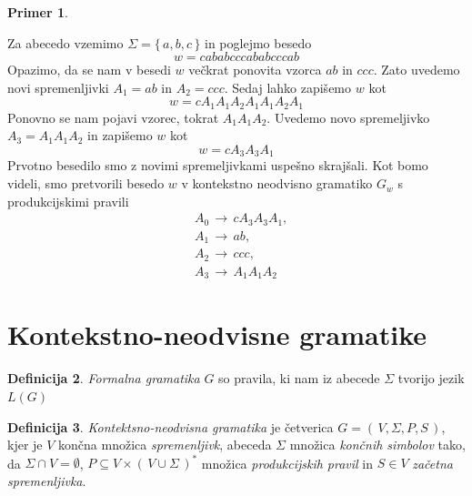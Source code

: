\documentclass{amsart}
\theoremstyle{definition} %
\newtheorem{definicija}{Definicija}[section]
\newtheorem{primer}[definicija]{Primer}
\theoremstyle{plain} %
\begin{document}
\begin{primer}\label{Kompresija}
    
    Za abecedo vzemimo $ \Sigma = \{\, a,b,c \,\} $ in poglejmo besedo
    \[
        w = cababcccababcccab
    \]
    Opazimo, da se nam v besedi $ w $ večkrat ponovita vzorca $ ab $ in $ ccc $. Zato
    uvedemo novi spremenljivki $ A_1 = ab $ in $ A_2 = ccc $. Sedaj lahko zapišemo $ w $ kot
    \[
        w = cA_1A_1A_2A_1A_1A_2A_1
    \]
    Ponovno se nam pojavi vzorec, tokrat $ A_1A_1A_2 $. Uvedemo novo spremeljivko $ A_3 = A_1A_1A_2 $
    in zapišemo $ w $ kot
    \[
        w = cA_3A_3A_1
    \]
    Prvotno besedilo smo z novimi spremeljivkami uspešno skrajšali. Kot bomo videli, smo
    pretvorili besedo $ w $ v kontekstno neodvisno gramatiko $ G_w $ s
    produkcijskimi pravili
    \begin{align*}
        & A_0 \, \rightarrow \, cA_3A_3A_1, \\
        & A_1 \, \rightarrow \, ab, \\
        & A_2 \, \rightarrow \, ccc, \\
        & A_3 \, \rightarrow \, A_1A_1A_2
    \end{align*}

\end{primer}

\section{Kontekstno-neodvisne gramatike}

\begin{definicija}

    \textit{Formalna gramatika} $ G $ so pravila, ki nam iz abecede $ \Sigma $ tvorijo jezik
    $ L(G) $

\end{definicija}

\begin{definicija}

    \textit{Kontektsno-neodvisna gramatika} je četverica $ G = (\, V, \Sigma, P, S \,) $, kjer je
    $ V $ končna množica \textit{spremenljivk}, abeceda $ \Sigma $ množica \textit{končnih simbolov} tako,
    da $ \Sigma \cap V = \emptyset $, $ P \subseteq V \times (\, V \cup \Sigma \,)^* $ množica 
    \textit{produkcijskih pravil} in $ S \in V $ \textit{začetna spremenljivka}.

\end{definicija}

\end{document}
